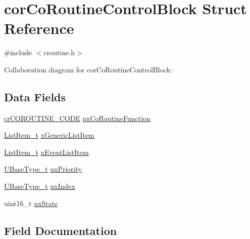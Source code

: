 \hypertarget{structcor_co_routine_control_block}{}\section{cor\+Co\+Routine\+Control\+Block Struct Reference}
\label{structcor_co_routine_control_block}


{\ttfamily \#include $<$croutine.\+h$>$}



Collaboration diagram for cor\+Co\+Routine\+Control\+Block\+:
\subsection*{Data Fields}
\begin{DoxyCompactItemize}
\item 
\hyperlink{croutine_8h_a397a7505718dd366d8411ce324c49758}{cr\+C\+O\+R\+O\+U\+T\+I\+N\+E\+\_\+\+C\+O\+DE} \hyperlink{structcor_co_routine_control_block_aa842d81ed7b4c345cf52cde20c5b22e5}{px\+Co\+Routine\+Function}
\item 
\hyperlink{list_8h_a1a62d469392f9bfe2443e7efab9c8398}{List\+Item\+\_\+t} \hyperlink{structcor_co_routine_control_block_ad91115e6e382ba8961310c4559abc7d2}{x\+Generic\+List\+Item}
\item 
\hyperlink{list_8h_a1a62d469392f9bfe2443e7efab9c8398}{List\+Item\+\_\+t} \hyperlink{structcor_co_routine_control_block_a139605d93d834601f34be927ecba3a15}{x\+Event\+List\+Item}
\item 
\hyperlink{portmacro_8h_a646f89d4298e4f5afd522202b11cb2e6}{U\+Base\+Type\+\_\+t} \hyperlink{structcor_co_routine_control_block_a0befed3dd0fe55b4314158f4814f50ae}{ux\+Priority}
\item 
\hyperlink{portmacro_8h_a646f89d4298e4f5afd522202b11cb2e6}{U\+Base\+Type\+\_\+t} \hyperlink{structcor_co_routine_control_block_a0a9f1b8d3c0676d256f119fdc5fddfb5}{ux\+Index}
\item 
uint16\+\_\+t \hyperlink{structcor_co_routine_control_block_a40a191332ff98e1969a821b870f59531}{ux\+State}
\end{DoxyCompactItemize}


\subsection{Field Documentation}
\mbox{\label{structcor_co_routine_control_block_aa842d81ed7b4c345cf52cde20c5b22e5}} 

